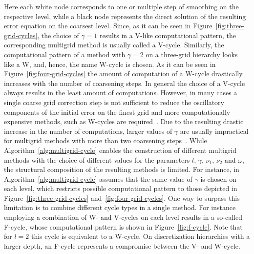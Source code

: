 Here each white node corresponds to one or multiple step of smoothing on the respective level, while a black node represents the direct solution of the resulting error equation on the coarsest level.
Since, as it can be seen in Figure~\ref{fig:three-grid-cycles}, the choice of $\gamma = 1$ results in a V-like computational pattern, the corresponding multigrid method is usually called a V-cycle.
Similarly, the computational pattern of a method with $\gamma = 2$ on a three-grid hierarchy looks like a W, and, hence, the name W-cycle is chosen.
As it can be seen in Figure~\ref{fig:four-grid-cycles} the amount of computation of a W-cycle drastically increases with the number of coarsening steps.
In general the choice of a V-cycle always results in the least amount of computations.
However, in many cases a single coarse grid correction step is not sufficient to reduce the oscillatory components of the initial error on the finest grid and more computationally expensive methods, such as W-cycles are required~\cite{trottenberg2000multigrid}.
Due to the resulting drastic increase in the number of computations, larger values of $\gamma$ are usually impractical for multigrid methods with more than two coarsening steps~\cite{trottenberg2000multigrid}.
While Algorithm~\ref{alg:multigrid-cycle} enables the construction of different multigrid methods with the choice of different values for the parameters $l$, $\gamma$, $\nu_1$, $\nu_2$ and $\omega$, the structural composition of the resulting methods is limited.
For instance, in Algorithm~\ref{alg:multigrid-cycle} assumes that the same value of $\gamma$ is chosen on each level, which restricts possible computational pattern to those depicted in Figure~\ref{fig:three-grid-cycles} and~\ref{fig:four-grid-cycles}.
One way to surpass this limitation is to combine different cycle types in a single method.
For instance employing a combination of W- and V-cycles on each level results in a so-called F-cycle, whose computational pattern is shown in Figure~\ref{fig:f-cycle}.
Note that for $l = 2$ this cycle is equivalent to a W-cycle.
On discretization hierarchies with a larger depth, an F-cycle represents a compromise between the V- and W-cycle.
